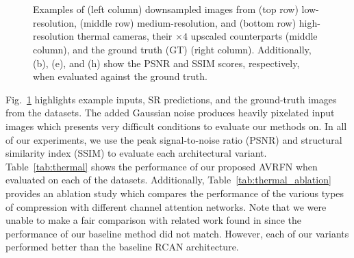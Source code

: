 \documentclass[runningheads]{llncs}
\begin{document}
\begin{figure}[ht]
\centering
{}
\\
\\
\caption{Examples of (left column) downsampled images from (top row)
low-resolution, (middle row) medium-resolution, and (bottom row)
high-resolution thermal cameras, their $\times 4$ upscaled counterparts (middle
column), and the ground truth (GT) (right column). Additionally, (b), (e), and
(h) show the PSNR and SSIM scores, respectively, when evaluated against the
ground truth.}
\label{fig:upscaling_4x_inputs_and_outputs}
\end{figure}

Fig.~\ref{fig:upscaling_4x_inputs_and_outputs} highlights example inputs, SR
predictions, and the ground-truth images from the datasets. The added Gaussian
noise produces heavily pixelated input images which presents very difficult
conditions to evaluate our methods on. In all of our experiments, we use the
peak signal-to-noise ratio (PSNR) and structural similarity index (SSIM) to
evaluate each architectural variant. Table~\ref{tab:thermal} shows the
performance of our proposed AVRFN when evaluated on each of the datasets.
Additionally, Table~\ref{tab:thermal_ablation} provides an ablation study which
compares the performance of the various types of compression with different
channel attention networks. Note that we were unable to make a fair comparison
with related work found in \cite{chudasama2020therisurnet} since the
performance of our baseline method did not match. However, each of our variants
performed better than the baseline RCAN architecture. 
\end{document}
